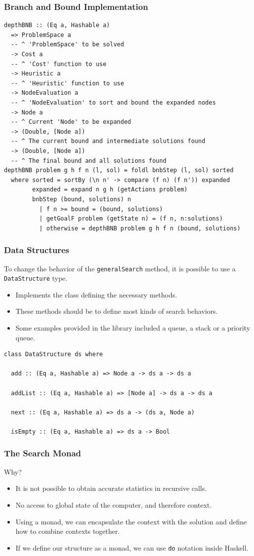 \documentclass{beamer}
\begin{document}
\begin{frame}[fragile]
  \frametitle{Branch and Bound Implementation}
\begin{lstlisting}[style=haskell]
depthBNB :: (Eq a, Hashable a)
  => ProblemSpace a
  -- ^ 'ProblemSpace' to be solved
  -> Cost a
  -- ^ 'Cost' function to use
  -> Heuristic a
  -- ^ 'Heuristic' function to use
  -> NodeEvaluation a
  -- ^ 'NodeEvaluation' to sort and bound the expanded nodes
  -> Node a
  -- ^ Current 'Node' to be expanded
  -> (Double, [Node a])
  -- ^ The current bound and intermediate solutions found
  -> (Double, [Node a])
  -- ^ The final bound and all solutions found
depthBNB problem g h f n (l, sol) = foldl bnbStep (l, sol) sorted
  where sorted = sortBy (\n n' -> compare (f n) (f n')) expanded
        expanded = expand n g h (getActions problem)
        bnbStep (bound, solutions) n
          | f n >= bound = (bound, solutions)
          | getGoalF problem (getState n) = (f n, n:solutions)
          | otherwise = depthBNB problem g h f n (bound, solutions)
\end{lstlisting}
\end{frame}

\begin{frame}[fragile]
  \frametitle{Data Structures}
  To change the behavior of the \texttt{generalSearch} method, it is possible
  to use a \texttt{DataStructure} type.
  \begin{itemize}
  \item Implements the class defining the necessary methods.
  \item These methods should be to define most kinds of search behaviors.
  \item Some examples provided in the library included a queue, a stack or a
    priority queue.
  \end{itemize}
\begin{lstlisting}[style=haskell]
class DataStructure ds where

  add :: (Eq a, Hashable a) => Node a -> ds a -> ds a

  addList :: (Eq a, Hashable a) => [Node a] -> ds a -> ds a

  next :: (Eq a, Hashable a) => ds a -> (ds a, Node a)

  isEmpty :: (Eq a, Hashable a) => ds a -> Bool
\end{lstlisting}
\end{frame}

\begin{frame}
  \frametitle{The Search Monad}
  Why?
  \begin{itemize}
  \item It is not possible to obtain accurate statistics in recursive calls.
  \item No access to global state of the computer, and therefore context.
  \item Using a monad, we can encapsulate the context with the solution and
    define how to combine contexts together.
  \item If we define our structure as a monad, we can use \texttt{do} notation
    inside Haskell.
  \end{itemize}
\end{frame}
\end{document}
